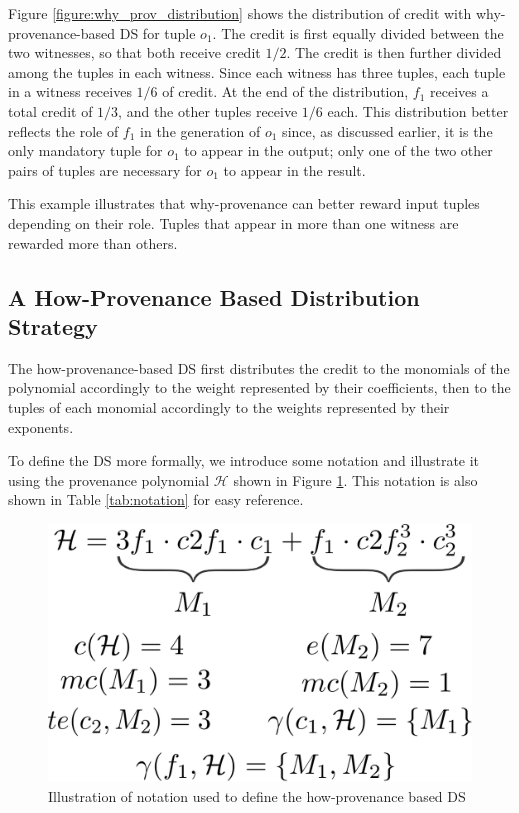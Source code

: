 \documentclass[preprint,12pt,sort&compress]{elsarticle}
\newcommand{\eat}[1]{}
\newcommand{\scream}[1]{{\bf * #1 *}{\typeout{#1}}}
\begin{document}
Figure \ref{figure:why_prov_distribution} shows the distribution of credit with why-provenance-based DS for tuple $o_1$.
The credit is first equally divided between the two witnesses, so that both receive credit $1/2$. 
The credit is then further divided among the tuples in each witness. Since each witness has three tuples, each tuple in a witness receives $1/6$ of credit. At the end of the distribution, $f_1$ receives a total credit of $1/3$, and the other tuples receive $1/6$ each.
This distribution better reflects the role of $f_1$ in the generation of $o_1$ since, as discussed earlier, it is the only mandatory tuple for $o_1$ to appear in the output; only one of the two other pairs of tuples are necessary for $o_1$ to appear in the result. 

This example illustrates that why-provenance can better reward input tuples depending on their role. Tuples that appear in more than one witness are rewarded more than others. 
\eat{This means that tuples that are more important to the generation of the output, since they are used more by the query, are rewarded more than tuples that are ``interchangeable'' with others. }

\subsection{A How-Provenance Based Distribution Strategy}
\label{section:how_prov_distr_tuples}



The how-provenance-based DS first distributes the credit to the monomials of the polynomial accordingly to the weight represented by their coefficients, then to the tuples of each monomial accordingly to the weights represented by their exponents. 

To define the DS more formally, we introduce some notation and illustrate it using the provenance polynomial $\mathcal{H}$ shown in Figure \ref{figure:how_example}. This notation is also shown  in Table \ref{tab:notation} for easy reference.


\begin{figure}[]
\centering
  \includegraphics[width=.4\textwidth]{figures/how_example}
  \caption{Illustration of notation used to define the how-provenance based DS } %
  \label{figure:how_example}
\end{figure}
\end{document}
